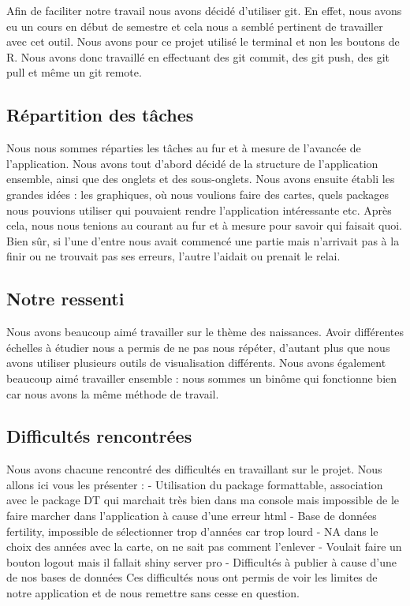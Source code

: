 \documentclass[
]{article}
\begin{document}
Afin de faciliter notre travail nous avons décidé d'utiliser git. En
effet, nous avons eu un cours en début de semestre et cela nous a semblé
pertinent de travailler avec cet outil. Nous avons pour ce projet
utilisé le terminal et non les boutons de R. Nous avons donc travaillé
en effectuant des git commit, des git push, des git pull et même un git
remote.

\hypertarget{ruxe9partition-des-tuxe2ches}{%
\subsection{Répartition des tâches}\label{ruxe9partition-des-tuxe2ches}}

Nous nous sommes réparties les tâches au fur et à mesure de l'avancée de
l'application. Nous avons tout d'abord décidé de la structure de
l'application ensemble, ainsi que des onglets et des sous-onglets. Nous
avons ensuite établi les grandes idées : les graphiques, où nous
voulions faire des cartes, quels packages nous pouvions utiliser qui
pouvaient rendre l'application intéressante etc. Après cela, nous nous
tenions au courant au fur et à mesure pour savoir qui faisait quoi. Bien
sûr, si l'une d'entre nous avait commencé une partie mais n'arrivait pas
à la finir ou ne trouvait pas ses erreurs, l'autre l'aidait ou prenait
le relai.

\hypertarget{notre-ressenti}{%
\subsection{Notre ressenti}\label{notre-ressenti}}

Nous avons beaucoup aimé travailler sur le thème des naissances. Avoir
différentes échelles à étudier nous a permis de ne pas nous répéter,
d'autant plus que nous avons utiliser plusieurs outils de visualisation
différents. Nous avons également beaucoup aimé travailler ensemble :
nous sommes un binôme qui fonctionne bien car nous avons la même méthode
de travail.

\hypertarget{difficultuxe9s-rencontruxe9es}{%
\subsection{Difficultés
rencontrées}\label{difficultuxe9s-rencontruxe9es}}

Nous avons chacune rencontré des difficultés en travaillant sur le
projet. Nous allons ici vous les présenter : - Utilisation du package
formattable, association avec le package DT qui marchait très bien dans
ma console mais impossible de le faire marcher dans l'application à
cause d'une erreur html - Base de données fertility, impossible de
sélectionner trop d'années car trop lourd - NA dans le choix des années
avec la carte, on ne sait pas comment l'enlever - Voulait faire un
bouton logout mais il fallait shiny server pro - Difficultés à publier à
cause d'une de nos bases de données Ces difficultés nous ont permis de
voir les limites de notre application et de nous remettre sans cesse en
question.
\end{document}
